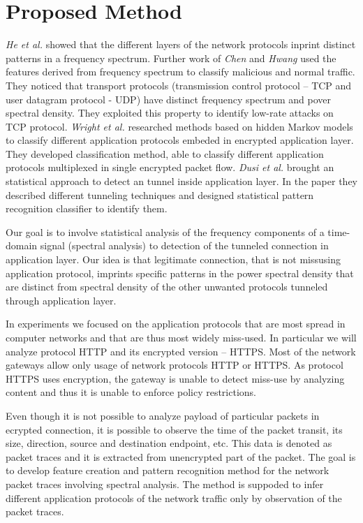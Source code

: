 
\chapter{Proposed Method}

\emph{He et al.} \cite{he2004spectral} showed that the different layers of the network
protocols inprint distinct patterns in a frequency spectrum. 
Further work of \emph{Chen} and \emph{Hwang} \cite{chen2007spectral}
used the features derived %
from frequency spectrum to classify malicious and normal traffic.
They noticed that transport protocols (transmission control protocol --
TCP and user datagram protocol - UDP) 
have distinct frequency spectrum and pover spectral density. 
They exploited this property to identify low-rate attacks on TCP protocol.
\emph{Wright et al.} \cite{wright2006inferring} researched methods based on 
hidden Markov models to classify different application protocols embeded in 
encrypted application layer.
They developed classification method, able to classify different 
application protocols multiplexed in single encrypted packet flow.
\emph{Dusi et al.} \cite{dusi2009tunnel} brought an statistical approach 
to detect an tunnel inside application layer.
In the paper they described different tunneling techniques and designed 
statistical pattern recognition classifier to identify them.

Our goal is to involve statistical analysis of the frequency components of a 
time-domain signal (spectral analysis) to detection of the tunneled 
connection in application layer.
Our idea is that legitimate connection, that is not missusing application protocol, 
imprints specific patterns in the 
power spectral density that are distinct from spectral density 
of the other unwanted protocols tunneled through application layer. 

In experiments we focused on the application protocols that are most 
spread in computer networks and that are thus most widely miss-used. 
In particular we will analyze protocol HTTP and its encrypted version -- HTTPS. 
Most of the network gateways allow only usage of network protocols HTTP or HTTPS. 
As protocol HTTPS uses encryption, the gateway is unable to detect miss-use by 
analyzing content and thus it is unable to enforce policy restrictions.

Even though it is not possible to analyze payload of particular packets in 
ecrypted connection, it is possible to observe the time of the packet transit, 
its size, direction, source and destination endpoint, etc. 
This data is denoted as packet traces and it is extracted from unencrypted 
part of the packet. 
The goal is to develop feature creation and pattern recognition method for 
the network packet traces involving spectral analysis.
The method is suppoded to infer different application protocols of 
the network traffic only by observation of the packet traces.

